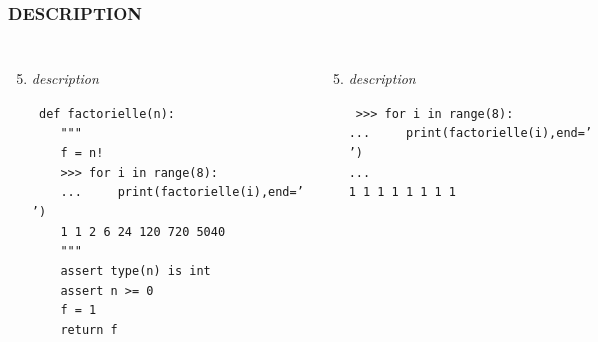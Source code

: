 \begin{frame}
\frametitle{\uppercase{Description}}
\begin{columns}[T]
\column{5.25cm}
\begin{enumerate}\setcounter{enumi}{4}
\item {\em description}
\begin{minipage}[t]{5.5cm}\scriptsize\tt
def factorielle(n):\\
\mbox{}\ \ \ \ {"""}\\
\mbox{}\ \ \ \ \alert{f = n!}\\
\mbox{}\ \ \ \ {{>}{>}> for i in range(8):}\\
\mbox{}\ \ \ \ {...\ \ \ \ \ print(factorielle(i),end=' ')}\\
\mbox{}\ \ \ \ {1 1 2 6 24 120 720 5040}\\
\mbox{}\ \ \ \ {"""}\\
\mbox{}\ \ \ \ assert type(n) is int\\
\mbox{}\ \ \ \ assert n >= 0\\
\mbox{}\ \ \ \ f = 1\\
\mbox{}\ \ \ \ return f
\end{minipage}
\end{enumerate}

\column{5.25cm}
\begin{enumerate}\setcounter{enumi}{4}
\item {\em description}
\begin{minipage}[t]{5cm}\scriptsize\tt
{>}{>}> for i in range(8):\\
...\ \ \ \ \ print(factorielle(i),end=' ')\\
...\\
1 1 1 1 1 1 1 1
\end{minipage}
\end{enumerate} 

\end{columns}

\end{frame}
